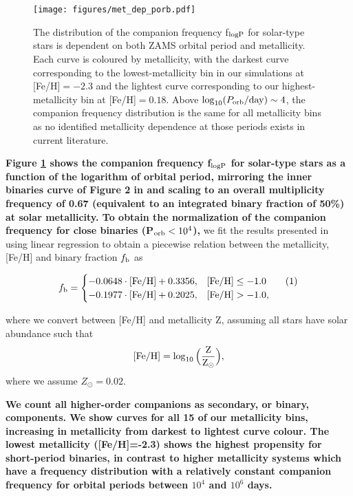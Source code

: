 \documentclass[twocolumn, linenumbers]{aastex631}
\newcommand\numberthis{\addtocounter{equation}{1}\tag{\theequation}}
\begin{document}
\begin{figure}
	\texttt{[image: figures/met\_dep\_porb.pdf]}
    \caption{The distribution of the companion frequency f$_{\rm{logP}}$ for solar-type stars is dependent on both ZAMS orbital period and metallicity. Each curve is coloured by metallicity, with the darkest curve corresponding to the lowest-metallicity bin in our simulations at [Fe/H]$=-2.3$ and the lightest curve corresponding to our highest-metallicity bin at [Fe/H]$=0.18$. Above $\log_{10}(P_{\rm{orb}}/\rm{day})\sim 4$, the companion frequency distribution is the same for all metallicity bins as no identified metallicity dependence at those periods exists in current literature.}
    \label{fig:met_dep_porb}
\end{figure}

\textbf{Figure \ref{fig:met_dep_porb} shows the companion frequency f$_{\rm{logP}}$ for solar-type stars as a function of the logarithm of orbital period, mirroring the inner binaries curve of Figure 2 in \citet{Moe2021} and scaling to an overall multiplicity frequency of 0.67 (equivalent to an integrated binary fraction of 50\%) at solar metallicity. To obtain the normalization of the companion frequency for close binaries (P$_{\rm{orb}}<10^4$),} we fit the results presented in \citet{Moe2019} using linear regression to obtain a piecewise relation between the metallicity, [Fe/H] and  binary fraction $f_{\rm{b}}$ as

\[f_{\rm{b}}= \begin{cases} 
      - 0.0648 \cdot [\rm{Fe/H}] + 0.3356, & [\rm{Fe/H}]\leq -1.0 \numberthis \\
      -0.1977 \cdot [\rm{Fe/H}] + 0.2025, & [\rm{Fe/H}]> -1.0  , 
   \end{cases}
\]

\noindent where we convert between [Fe/H] and metallicity Z, assuming all stars have solar abundance such that
\begin{equation}
\label{eq:metallicity}
    [\rm{Fe/H}] = \log_{10}\Big(\frac{Z}{Z_{\odot}}\Big),
\end{equation}
\noindent where we assume $Z_{\odot}=0.02$.

\textbf{We count all higher-order companions as secondary, or binary, components. We show curves for all 15 of our metallicity bins, increasing in metallicity from darkest to lightest curve colour. The lowest metallicity ([Fe/H]=-2.3) shows the highest propensity for short-period binaries, in contrast to higher metallicity systems which have a frequency distribution with a relatively constant companion frequency for orbital periods between $10^4$ and $10^6$ days.}
\end{document}
